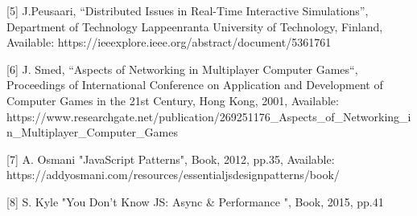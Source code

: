 \documentclass[conference]{IEEEtran}
\begin{document}
[5] J.Peusaari, “Distributed Issues in Real-Time Interactive Simulations”, Department of Technology Lappeenranta University of Technology, Finland,
 Available: https://ieeexplore.ieee.org/abstract/document/5361761
 
[6] J. Smed, “Aspects of Networking in Multiplayer Computer Games“, Proceedings of International Conference on Application and Development of Computer Games in the 21st Century, Hong Kong, 2001,
Available: https://www.researchgate.net/publication/269251176\_Aspects\_of\_Networking\_in\_Multiplayer\_Computer\_Games

[7] A. Osmani "JavaScript Patterns", Book, 2012, pp.35, Available: https://addyosmani.com/resources/essentialjsdesignpatterns/book/

[8] S. Kyle "You Don't Know JS: Async \& Performance ", Book, 2015, pp.41
\end{document}
